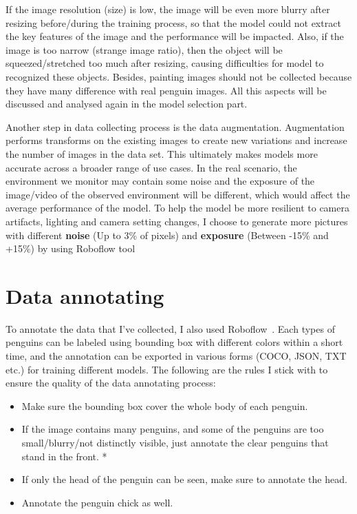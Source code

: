 \documentclass[runningheads]{llncs}
\begin{document}
If the image resolution (size) is low, the image will be even more blurry after resizing before/during the training process, so that the model could not extract the key features of the image and the performance will be impacted. Also, if the image is too narrow (strange image ratio), then the object will be squeezed/stretched too much after resizing, causing difficulties for model to recognized these objects. Besides, painting images should not be collected because they have many difference with real penguin images. All this aspects will be discussed and analysed again in the model selection part.

Another step in data collecting process is the data augmentation. Augmentation performs transforms on the existing images to create new variations and increase the number of images in the data set. This ultimately makes models more accurate across a broader range of use cases. 
In the real scenario, the environment we monitor may contain some noise and the exposure of the image/video of the observed environment will be different, which would affect the average performance of the model. To help the model be more resilient to camera artifacts, lighting and camera setting changes, I choose to generate more pictures with different \textbf{noise} (Up to 3\% of pixels) and \textbf{exposure} (Between -15\% and +15\%) by using Roboflow tool~\cite{ref_roboflow}


\section{Data annotating}
To annotate the data that I've collected, I also used Roboflow~\cite{ref_roboflow}. Each types of penguins can be labeled using bounding box with different colors within a short time, and the annotation can be exported in various forms (COCO, JSON, TXT etc.) for training different models. The following are the rules I stick with to ensure the quality of the data annotating process:

\begin{itemize}
  \item Make sure the bounding box cover the whole body of each penguin.
  \item If the image contains many penguins, and some of the penguins are too small/blurry/not distinctly visible, just annotate the clear penguins that stand in the front. *
  \item If only the head of the penguin can be seen, make sure to annotate the head.
  \item Annotate the penguin chick as well.
\end{itemize}
\end{document}
